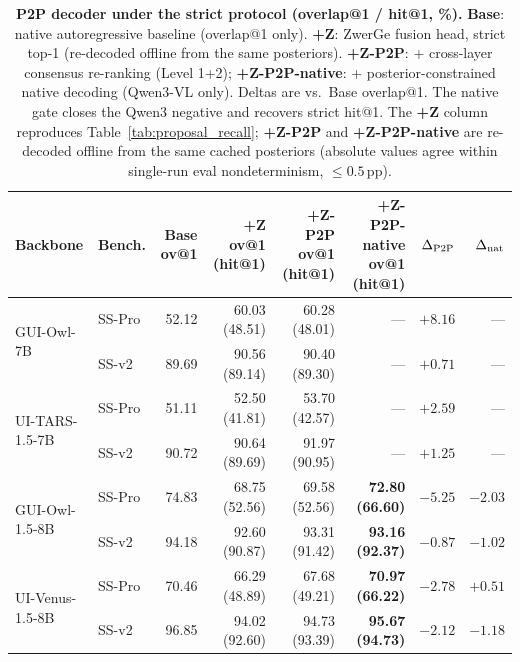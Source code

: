 \begin{table}[t]
\centering
\caption{
  \textbf{P2P decoder under the strict protocol (overlap@1 / hit@1, \%).}
  \textbf{Base}: native autoregressive baseline (overlap@1 only).
  \textbf{+Z}: ZwerGe fusion head, strict top-1 (re-decoded offline from the same posteriors).
  \textbf{+Z-P2P}: + cross-layer consensus re-ranking (Level 1+2); \textbf{+Z-P2P-native}: + posterior-constrained native decoding (Qwen3-VL only).
  Deltas are vs.\ Base overlap@1. The native gate closes the Qwen3 negative and recovers strict hit@1. The \textbf{+Z} column reproduces Table~\ref{tab:proposal_recall}; \textbf{+Z-P2P} and \textbf{+Z-P2P-native} are re-decoded offline from the same cached posteriors (absolute values agree within single-run eval nondeterminism, $\le 0.5$\,pp).
}
\label{tab:p2p_results}
\small
\setlength{\tabcolsep}{5pt}
\begin{tabular}{l l r r r r r r}
\toprule
\textbf{Backbone} & \textbf{Bench.} & \textbf{Base ov@1} & \textbf{+Z ov@1 (hit@1)} & \textbf{+Z-P2P ov@1 (hit@1)} & \textbf{+Z-P2P-native ov@1 (hit@1)} & $\Delta_{\rm P2P}$ & $\Delta_{\rm nat}$ \\
\midrule
\multirow{2}{*}{GUI-Owl-7B}
 & SS-Pro  & 52.12 & 60.03 (48.51) & 60.28 (48.01) & ---                      & $+8.16$ & --- \\
 & SS-v2   & 89.69 & 90.56 (89.14) & 90.40 (89.30) & ---                     & $+0.71$ & --- \\
\midrule
\multirow{2}{*}{UI-TARS-1.5-7B}
 & SS-Pro  & 51.11 & 52.50 (41.81) & 53.70 (42.57) & ---                     & $+2.59$ & --- \\
 & SS-v2   & 90.72 & 90.64 (89.69) & 91.97 (90.95) & ---                     & $+1.25$ & --- \\
\midrule
\multirow{2}{*}{GUI-Owl-1.5-8B}
 & SS-Pro  & 74.83 & 68.75 (52.56) & 69.58 (52.56) & \textbf{72.80 (66.60)}  & $-5.25$ & $\mathbf{-2.03}$ \\
 & SS-v2   & 94.18 & 92.60 (90.87) & 93.31 (91.42) & \textbf{93.16 (92.37)}  & $-0.87$ & $\mathbf{-1.02}$ \\
\midrule
\multirow{2}{*}{UI-Venus-1.5-8B}
 & SS-Pro  & 70.46 & 66.29 (48.89) & 67.68 (49.21) & \textbf{70.97 (66.22)}  & $-2.78$ & $\mathbf{+0.51}$ \\
 & SS-v2   & 96.85 & 94.02 (92.60) & 94.73 (93.39) & \textbf{95.67 (94.73)}  & $-2.12$ & $\mathbf{-1.18}$ \\
\bottomrule
\end{tabular}
\end{table}

